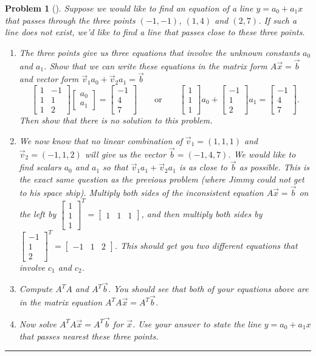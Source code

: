 \documentclass[letterpaper,oneside]{book}%
\theoremstyle{plain}
\theoremstyle{box}
\theoremstyle{problem}
\newtheorem{problemnum}{Problem}[chapter]
\newenvironment{problem}[1][]{\begin{problemnum}[#1]}{\end{problemnum}\nopagebreak\hrule\bigskip}
\newcommand{\bvec}[1]{\begin{bmatrix} #1 \end{bmatrix}}
\begin{document}
\begin{problem}
 Suppose we would like to find an equation of a line $y=a_0+a_1x$ that passes through the three points 
 $(-1,-1)$, $(1,4)$ and $(2,7)$. If such a line does not exist, we'd like to find a line that passes close to these three points. 
 \begin{enumerate}
  \item The three points give us three equations that involve the unknown constants $a_0$ and $a_1$. Show that we can write these equations in the matrix form $A\vec x = \vec b$ and vector form $\vec v_1a_0+\vec v_2a_1 = \vec b$ 
  $$\bvec{1&-1\\1&1\\1&2}\bvec{a_0\\a_1}=\bvec{-1\\4\\7}\quad\quad\text{or}\quad\quad \bvec{1\\1\\1}a_0+\bvec{-1\\1\\2}a_1=\bvec{-1\\4\\7}.$$
  Then show that there is no solution to this problem.
  \item We now know that no linear combination of $\vec v_1=(1,1,1)$ and $\vec v_2 =(-1,1,2)$ will give us the vector $\vec b=(-1,4,7)$.  We would like to find scalars $a_0$ and $a_1$ so that $\vec v_1a_1+\vec v_2a_1$ is as close to $\vec b$ as possible. This is the exact same question as the previous problem (where Jimmy could not get to his space ship). 
  Multiply both sides of the inconsistent equation $A\vec x = \vec b$ on the left by $\bvec{1\\1\\1}^T = \bvec{1&1&1}$, and then multiply both sides by  $\bvec{-1\\1\\2}^T = \bvec{-1&1&2}$. This should get you two different equations that involve $c_1$ and $c_2$. 
  \item Compute $A^TA$ and $A^T\vec b$.  You should see that both of your equations above are in the matrix equation $A^TA\vec x=A^T\vec b$. 
  \item Now solve $A^TA\vec x = A^T\vec b$ for $\vec x$. Use your answer to state the line  $y=a_0 +a_1x$ that passes nearest these three points. 
 \end{enumerate}
\end{problem}
 
\end{document}
